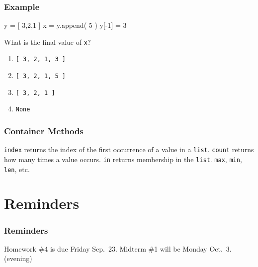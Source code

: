 \documentclass[11pt]{beamer}
\begin{document}
\begin{frame}[fragile]
  \frametitle{Example}
  \Enlarge

  \begin{semiverbatim}
y = [ 3,2,1 ]
x = y.append( 5 )
y[-1] = 3
  \end{semiverbatim}
  What is the final value of \texttt{x}?
  \begin{enumerate}[label=\Alph*]
  \item  \texttt{[ 3, 2, 1, 3 ]}
  \item  \texttt{[ 3, 2, 1, 5 ]}
  \item  \texttt{[ 3, 2, 1 ]}
  \item  \texttt{None}
  \end{enumerate}
\end{frame}

\begin{frame}[fragile]
  \frametitle{Container Methods}
  \Enlarge

  \begin{itemize}
  \myitem  \texttt{index} returns the index of the first occurrence of a value in a \texttt{list}.
  \myitem  \texttt{count} returns how many times a value occurs.
  \myitem  \texttt{in} returns membership in the \texttt{list}.
  \myitem  \texttt{max}, \texttt{min}, \texttt{len}, etc.
  \end{itemize}
\end{frame}


\section{Reminders}

\begin{frame}
  \frametitle{Reminders}
  \Enlarge

  \begin{itemize}
  \myitem  Homework \#4 is due Friday Sep.\ 23.
  \myitem  Midterm \#1 will be Monday Oct.\ 3.  (evening)
  \end{itemize}
\end{frame}
\end{document}
